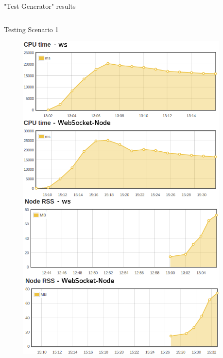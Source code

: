 \documentclass{soa.cs.pub.ro}
\begin{document}
\begin{frame}{"Test Generator" results}
  \begin{columns}
    \begin{column}[l]{0.45\textwidth}
      \begin{center}
        Testing Scenario 1
      \end{center}
      \begin{figure}
         \includegraphics[scale=0.18]{img/test1v2.png}
      \end{figure}
    \end{column}
    \begin{column}[l]{0.45\textwidth}
      \begin{center}

\end{center}
\end{column}
\end{columns}
\end{frame}
\end{document}
